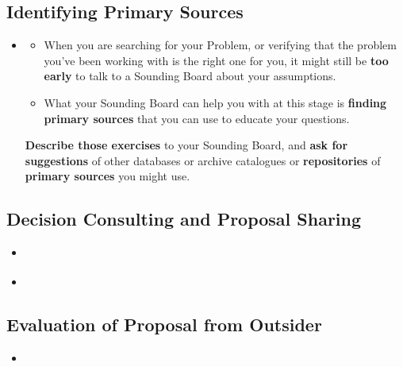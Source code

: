 \documentclass[11pt]{article}
\begin{document}
\subsection{Identifying Primary Sources}
\begin{itemize}
\item  \begin{exercise}
\begin{itemize}
\item When you are searching for your Problem, or verifying that the problem you’ve been working with is the right one for you, it might still be \textbf{too early} to talk to a Sounding Board about your assumptions. 

\item What your Sounding Board can help you with at this stage is \textbf{finding primary sources} that you can use to educate your questions. 
\end{itemize}

\textbf{Describe those exercises} to your Sounding Board, and \textbf{ask for suggestions} of other databases or archive catalogues or \textbf{repositories} of \textbf{primary sources} you might use.
\end{exercise}
\end{itemize}
\subsection{Decision Consulting and Proposal Sharing}
\begin{itemize}
\item \begin{exercise}
\end{exercise}

\vspace{20pt}
\item \begin{exercise}
\end{exercise}
\end{itemize}
\subsection{Evaluation of Proposal from Outsider}
\begin{itemize}
\item \begin{exercise}
\end{exercise}
\end{itemize}
\end{document}
